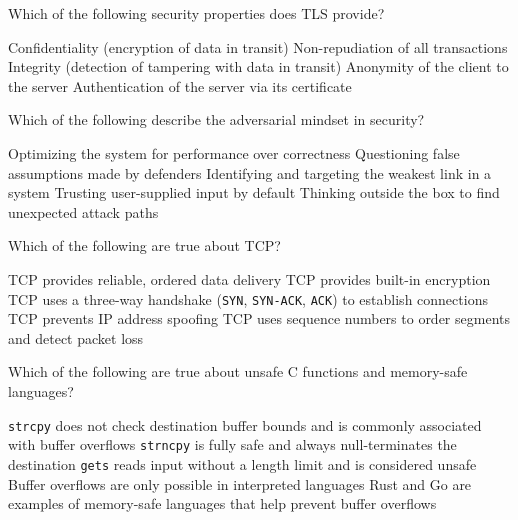 \documentclass[addpoints]{exam}
\begin{document}
\begin{questions}
\question Which of the following security properties does TLS provide?

\begin{checkboxes}
  \CorrectChoice Confidentiality (encryption of data in transit)
  \choice Non-repudiation of all transactions
  \CorrectChoice Integrity (detection of tampering with data in transit)
  \choice Anonymity of the client to the server
  \CorrectChoice Authentication of the server via its certificate
\end{checkboxes}


\question Which of the following describe the adversarial mindset in security?

\begin{checkboxes}
  \choice Optimizing the system for performance over correctness
  \CorrectChoice Questioning false assumptions made by defenders
  \CorrectChoice Identifying and targeting the weakest link in a system
  \choice Trusting user-supplied input by default
  \CorrectChoice Thinking outside the box to find unexpected attack paths
\end{checkboxes}



\question Which of the following are true about TCP?

\begin{checkboxes}
  \CorrectChoice TCP provides reliable, ordered data delivery
  \choice TCP provides built-in encryption
  \CorrectChoice TCP uses a three-way handshake (\texttt{SYN}, \texttt{SYN-ACK}, \texttt{ACK}) to establish connections
  \choice TCP prevents IP address spoofing
  \CorrectChoice TCP uses sequence numbers to order segments and detect packet loss
\end{checkboxes}


\question Which of the following are true about unsafe C functions and memory-safe languages?

\begin{checkboxes}
  \CorrectChoice \texttt{strcpy} does not check destination buffer bounds and is commonly associated with buffer overflows
  \choice \texttt{strncpy} is fully safe and always null-terminates the destination
  \CorrectChoice \texttt{gets} reads input without a length limit and is considered unsafe
  \choice Buffer overflows are only possible in interpreted languages
  \CorrectChoice Rust and Go are examples of memory-safe languages that help prevent buffer overflows
\end{checkboxes}




\end{questions}
\end{document}
